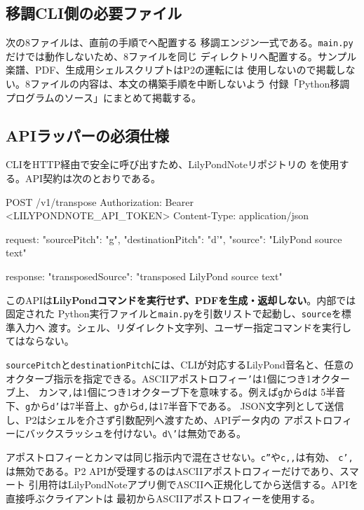 \documentclass[uplatex,a4paper,11pt]{jsarticle}
\begin{document}
\subsection{移調CLI側の必要ファイル}

次の8ファイルは、直前の手順でへ配置する
移調エンジン一式である。\texttt{main.py}だけでは動作しないため、8ファイルを同じ
ディレクトリへ配置する。サンプル楽譜、PDF、生成用シェルスクリプトはP2の運転には
使用しないので掲載しない。8ファイルの内容は、本文の構築手順を中断しないよう
付録「Python移調プログラムのソース」にまとめて掲載する。

\subsection{APIラッパーの必須仕様}

CLIをHTTP経由で安全に呼び出すため、LilyPondNoteリポジトリの
を使用する。API契約は次のとおりである。

\begin{command}
POST /v1/transpose
Authorization: Bearer <LILYPONDNOTE_API_TOKEN>
Content-Type: application/json

request:
{
  "sourcePitch": "g",
  "destinationPitch": "d'",
  "source": "LilyPond source text"
}

response:
{
  "transposedSource": "transposed LilyPond source text"
}
\end{command}

このAPIは\textbf{LilyPondコマンドを実行せず、PDFを生成・返却しない}。内部では固定された
Python実行ファイルと\texttt{main.py}を引数リストで起動し、\texttt{source}を標準入力へ
渡す。シェル、リダイレクト文字列、ユーザー指定コマンドを実行してはならない。

\texttt{sourcePitch}と\texttt{destinationPitch}には、CLIが対応するLilyPond音名と、任意の
オクターブ指示を指定できる。ASCIIアポストロフィー\texttt{'}は1個につき1オクターブ上、
カンマ\texttt{,}は1個につき1オクターブ下を意味する。例えば\texttt{g}から\texttt{d}は
5半音下、\texttt{g}から\texttt{d'}は7半音上、\texttt{g}から\texttt{d,}は17半音下である。
JSON文字列として送信し、P2はシェルを介さず引数配列へ渡すため、APIデータ内の
アポストロフィーにバックスラッシュを付けない。\texttt{d\textbackslash'}は無効である。

アポストロフィーとカンマは同じ指示内で混在させない。\texttt{c''}や\texttt{c,,}は有効、
\texttt{c',}は無効である。P2 APIが受理するのはASCIIアポストロフィーだけであり、スマート
引用符はLilyPondNoteアプリ側でASCIIへ正規化してから送信する。APIを直接呼ぶクライアントは
最初からASCIIアポストロフィーを使用する。
\end{document}
